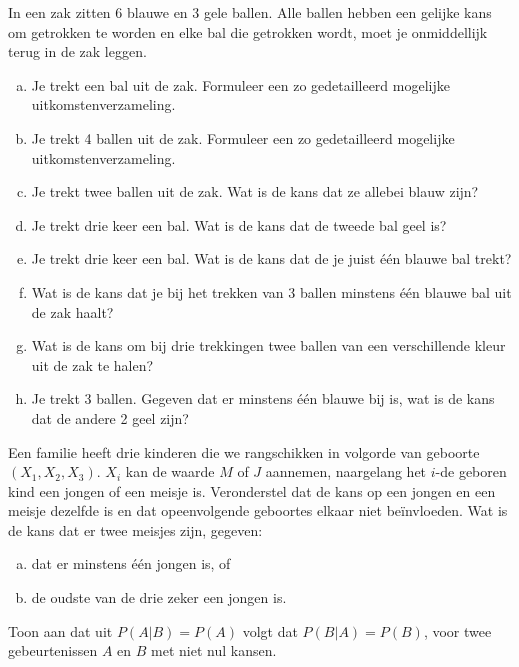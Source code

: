 \documentclass[12pt,twoside]{article}
\begin{document}
\begin{oefening}
In een zak zitten 6 blauwe en 3 gele ballen. Alle ballen hebben een gelijke kans om getrokken te worden en elke bal die getrokken wordt, moet je onmiddellijk terug in de zak leggen.
\begin{enumerate}[(a)]
  \item Je trekt een bal uit de zak. Formuleer een zo gedetailleerd mogelijke uitkomstenverzameling.
  \item Je trekt 4 ballen uit de zak. Formuleer een zo gedetailleerd mogelijke uitkomstenverzameling.
  \item Je trekt twee ballen uit de zak. Wat is de kans dat ze allebei blauw zijn?
  \item Je trekt drie keer een bal. Wat is de kans dat de tweede bal geel is?
  \item Je trekt drie keer een bal. Wat is de kans dat de je juist één blauwe bal trekt?
  \item Wat is de kans dat je bij het trekken van 3 ballen minstens één blauwe bal uit de zak haalt?
  \item Wat is de kans om bij drie trekkingen twee ballen van een verschillende kleur uit de zak te halen?
  \item Je trekt 3 ballen. Gegeven dat er minstens één blauwe bij is, wat is de kans dat de andere 2 geel zijn?
\end{enumerate}
\end{oefening}

\begin{oefening}
Een familie heeft drie kinderen die we rangschikken in volgorde van geboorte $(X_1, X_2, X_3)$. $X_i$ kan de waarde $M$ of $J$ aannemen, naargelang het $i$-de geboren kind een jongen of een meisje is. Veronderstel dat de kans op een jongen en een meisje dezelfde is en dat opeenvolgende geboortes elkaar niet beïnvloeden. Wat is de kans dat er twee meisjes zijn, gegeven:
\begin{enumerate}[(a)]
  \item dat er minstens één jongen is, of
  \item de oudste van de drie zeker een jongen is.
\end{enumerate}
\end{oefening}

\begin{oefening}
Toon aan dat uit $P(A|B)=P(A)$ volgt dat $P(B|A)=P(B)$, voor twee gebeurtenissen $A$ en $B$ met niet nul kansen.
\end{oefening}
\end{document}
